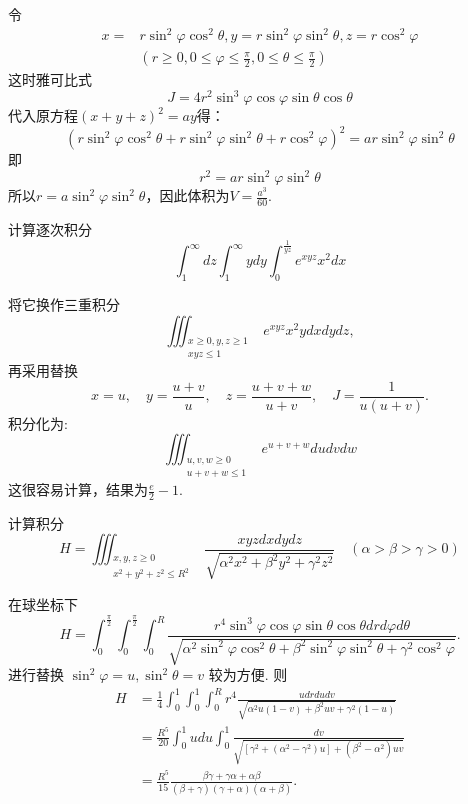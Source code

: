 \begin{solution}
    令
    $$
    \begin{aligned}
    x= & r \sin ^2 \varphi \cos ^2 \theta, y=r \sin ^2 \varphi \sin ^2 \theta, z=r \cos ^2 \varphi \\
    & \left(r \geqslant 0,0 \leqslant \varphi \leqslant \frac{\pi}{2}, 0 \leqslant \theta \leqslant \frac{\pi}{2}\right)
    \end{aligned}
    $$
    这时雅可比式
    $$
    J=4 r^2 \sin ^3 \varphi \cos \varphi \sin \theta \cos \theta
    $$
    代入原方程$(x+y+z)^2=ay$得：
    $$
    (r\sin^2\varphi\cos^2\theta + r\sin^2\varphi\sin^2\theta + r\cos^2\varphi)^2 = ar\sin^2\varphi\sin^2\theta
    $$
    即
    $$
    r^2 = ar\sin^2\varphi\sin^2\theta
    $$
    所以$r = a\sin^2\varphi\sin^2\theta$，因此体积为$V = \frac{a^3}{60}$.
\end{solution}

\begin{exercise}
    计算逐次积分
    $$
    \int_1^{\infty} d z \int_1^{\infty} y d y \int_0^{\frac{1}{y z}} e^{x y z} x^2 d x
    $$
\end{exercise}

\begin{solution}
    将它换作三重积分
    $$
    \iiint_{\substack{x \geqslant 0, y, z \geqslant 1 \\ x y z \leqslant 1}} e^{x y z} x^2 y d x d y d z,
    $$
    再采用替换
    $$
    x=u, \quad y=\frac{u+v}{u}, \quad z=\frac{u+v+w}{u+v}, \quad J=\frac{1}{u(u+v)} .
    $$
    积分化为:
    $$
    \iiint_{\substack{u, v, w \geqslant 0 \\ u+v+w \leqslant 1}} e^{u+v+w} d u d v d w
    $$
    这很容易计算，结果为$\frac{e}{2}-1$.
\end{solution}

\begin{exercise}
    计算积分
    $$
    H=\iiint_{\substack{x, y, z \geqslant 0 \\ x^2+y^2+z^2 \leqslant R^2}} \frac{x y z d x d y d z}{\sqrt{\alpha^2 x^2+\beta^2 y^2+\gamma^2 z^2}} \quad(\alpha>\beta>\gamma>0)
    $$
\end{exercise}

\begin{solution}
    在球坐标下
    $$
    H=\int_0^{\frac{\pi}{2}} \int_0^{\frac{\pi}{2}} \int_0^R \frac{r^4 \sin ^3 \varphi \cos \varphi \sin \theta \cos \theta d r d \varphi d \theta}{\sqrt{\alpha^2 \sin ^2 \varphi \cos ^2 \theta+\beta^2 \sin ^2 \varphi \sin ^2 \theta+\gamma^2 \cos ^2 \varphi}} .
    $$
    进行替换 $\sin ^2 \varphi=u, \sin ^2 \theta=v$ 较为方便. 则
    $$
    \begin{aligned}
    H & =\frac{1}{4} \int_0^1 \int_0^1 \int_0^R r^4 \frac{u d r d u d v}{\sqrt{\alpha^2 u(1-v)+\beta^2 u v+\gamma^2(1-u)}} \\
    & =\frac{R^5}{20} \int_0^1 u d u \int_0^1 \frac{d v}{\sqrt{\left[\gamma^2+\left(\alpha^2-\gamma^2\right) u\right]+\left(\beta^2-\alpha^2\right) u v}} \\
    & =\frac{R^5}{15} \frac{\beta \gamma+\gamma \alpha+\alpha \beta}{(\beta+\gamma)(\gamma+\alpha)(\alpha+\beta)} .
    \end{aligned}
    $$
\end{solution}


